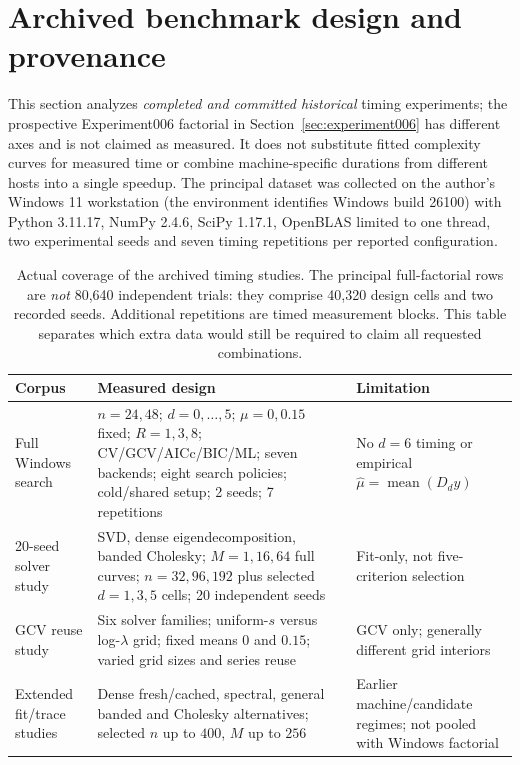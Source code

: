 \section{Archived benchmark design and provenance}\label{sec:design}
This section analyzes \emph{completed and committed historical} timing experiments; the prospective Experiment006 factorial in Section~\ref{sec:experiment006} has different axes and is not claimed as measured. It does not substitute fitted complexity curves for measured time or combine machine-specific durations from different hosts into a single speedup. The principal dataset was collected on the author's Windows 11 workstation (the environment identifies Windows build 26100) with Python 3.11.17, NumPy 2.4.6, SciPy 1.17.1, OpenBLAS limited to one thread, two experimental seeds and seven timing repetitions per reported configuration.

\begin{table}[t]
\caption{Actual coverage of the archived timing studies. The principal full-factorial rows are \emph{not} 80,640 independent trials: they comprise 40,320 design cells and two recorded seeds. Additional repetitions are timed measurement blocks. This table separates which extra data would still be required to claim all requested combinations.}
\label{tab:design}\centering
\setlength{\tabcolsep}{5pt}
\begin{tabular}{@{}p{}p{}p{}@{}}
\toprule
Corpus & Measured design & Limitation\\
\midrule
Full Windows search & $n=24,48$; $d=0,\ldots,5$; $\mu=0,0.15$ fixed; $R=1,3,8$; CV/GCV/AICc/BIC/ML; seven backends; eight search policies; cold/shared setup; 2 seeds; 7 repetitions & No $d=6$ timing or empirical $\widehat\mu=\operatorname{mean}(D_dy)$\\
20-seed solver study & SVD, dense eigendecomposition, banded Cholesky; $M=1,16,64$ full curves; $n=32,96,192$ plus selected $d=1,3,5$ cells; 20 independent seeds & Fit-only, not five-criterion selection\\
GCV reuse study & Six solver families; uniform-$s$ versus log-$\lambda$ grid; fixed means $0$ and $0.15$; varied grid sizes and series reuse & GCV only; generally different grid interiors\\
Extended fit/trace studies & Dense fresh/cached, spectral, general banded and Cholesky alternatives; selected $n$ up to $400$, $M$ up to $256$ & Earlier machine/candidate regimes; not pooled with Windows factorial\\
\bottomrule
\end{tabular}
\end{table}

